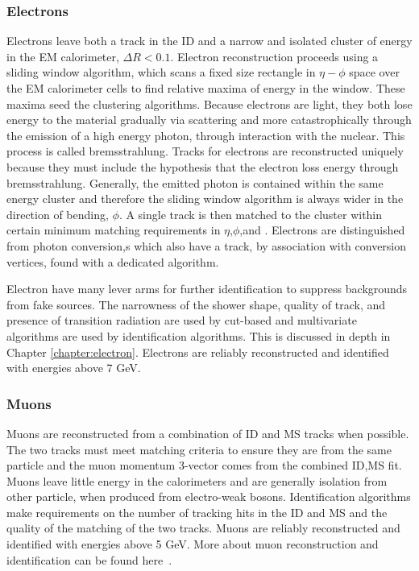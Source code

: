 \subsubsection{Electrons}

Electrons leave both a track in the ID and a narrow and isolated cluster of energy in the EM calorimeter, $\Delta R < 0.1$. Electron reconstruction proceeds using a sliding window algorithm, which scans a fixed size rectangle in $\eta-\phi$ space over the EM calorimeter cells to find relative maxima of energy in the window\cite{ATLAS-CONF-2014-032}. These maxima seed the clustering algorithms. Because electrons are light, they both lose energy to the material gradually via scattering and more catastrophically through the emission of a high energy photon, through interaction with the nuclear. This process is called bremsstrahlung. Tracks for electrons are reconstructed uniquely because they must include the hypothesis that the electron loss energy through bremsstrahlung. Generally, the emitted photon is contained within the same energy cluster and therefore the sliding window algorithm is always wider in the direction of bending, $\phi$. A single track is then matched to the cluster within certain minimum matching requirements in $\eta$,$\phi$,and \pt. Electrons are distinguished from photon conversion,s which also have a track, by association with conversion vertices, found with a dedicated algorithm.

Electron have many lever arms for further identification to suppress backgrounds from fake sources. The narrowness of the shower shape, quality of track, and presence of transition radiation are used by cut-based and multivariate algorithms are used by identification algorithms. This is discussed in depth in Chapter \ref{chapter:electron}. Electrons are reliably reconstructed and identified with energies above 7 GeV. 

\subsubsection{Muons}

Muons are reconstructed from a combination of ID and MS tracks when possible. The two tracks must meet matching criteria to ensure they are from the same particle and the muon momentum 3-vector comes from the combined ID,MS fit. Muons leave little energy in the calorimeters and are generally isolation from other particle, when produced from electro-weak bosons. Identification algorithms make requirements on the number of tracking hits in the ID and MS and the quality of the matching of the two tracks. Muons are reliably reconstructed and identified with energies above 5 GeV. More about muon reconstruction and identification can be found here~\cite{MCP2012}.


